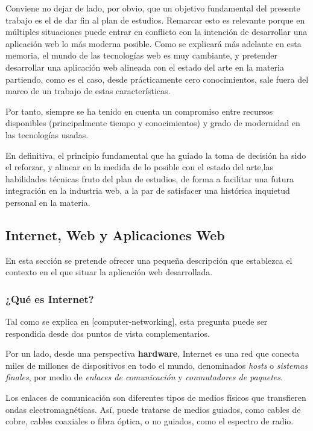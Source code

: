 \documentclass[a4paper]{report}
\begin{document}
    Conviene no dejar de lado, por obvio, que un objetivo fundamental del presente trabajo es el de dar fin al plan de estudios.
    Remarcar esto es relevante porque en múltiples situaciones puede entrar en conflicto con la intención de desarrollar una aplicación web lo más moderna posible.
    Como se explicará más adelante en esta memoria, el mundo de las tecnologías web es muy cambiante,
    y pretender desarrollar una aplicación web alineada con el estado del arte en la materia partiendo, como es el caso, desde prácticamente cero conocimientos,
    sale fuera del marco de un trabajo de estas características.

    Por tanto, siempre se ha tenido en cuenta un compromiso entre recursos disponibles (principalmente tiempo y conocimientos) y grado de modernidad en las tecnologías usadas.

    En definitiva, el principio fundamental que ha guiado la toma de decisión ha sido el reforzar, y alinear en la medida de lo posible con el estado del arte,las habilidades técnicas fruto del plan de estudios, de forma a facilitar una futura integración en la industria web,
    a la par de satisfacer una histórica inquietud personal en la materia.


    \subsection{Internet, Web y Aplicaciones Web}
    En esta sección se pretende ofrecer una pequeña descripción que establezca el contexto en el que situar la aplicación web desarrollada.

    \subsubsection{¿Qué es Internet?}
    Tal como se explica en [computer-networking], esta pregunta puede ser respondida desde dos puntos de vista complementarios.

    Por un lado, desde una perspectiva \textbf{hardware}, Internet es una red que conecta miles de millones de dispositivos en todo el mundo,
    denominados \emph{hosts} o \emph{sistemas finales}, por medio de \emph{enlaces de comunicación} y \emph{conmutadores de paquetes}.
    
    Los enlaces de comunicación son diferentes tipos de medios físicos que transfieren ondas electromagnéticas. Así, puede tratarse de medios guiados, como cables de cobre, cables coaxiales o fibra óptica, o no guiados, como el espectro de radio.
    
\end{document}
